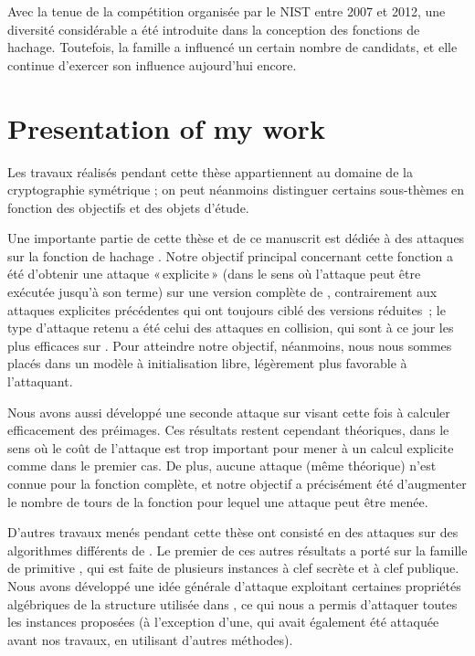 Avec la tenue de la compétition \shathree organisée par le NIST entre 2007 et 2012, une diversité considérable a été introduite dans la conception des fonctions de hachage.
Toutefois, la famille \mdsha a influencé un certain nombre de candidats, et elle continue d'exercer son influence aujourd'hui encore.

\chapter[Présentation de mes travaux]{Presentation of my work}

Les travaux réalisés pendant cette thèse appartiennent au domaine de la cryptographie symétrique ; on peut néanmoins distinguer certains sous-thèmes en fonction des objectifs et des objets d'étude.

\medskip

Une importante partie de cette thèse et de ce manuscrit est dédiée à des attaques sur la fonction de hachage \shaone. Notre objectif principal concernant cette fonction a été d'obtenir
une attaque «\,explicite\,» (dans le sens où l'attaque peut être exécutée jusqu'à son terme) sur une version complète de \shaone,
contrairement aux attaques explicites précédentes
qui ont toujours ciblé des versions réduites~; le type d'attaque retenu a été celui des attaques en collision, qui sont à ce jour les plus efficaces sur \shaone.
Pour atteindre notre objectif, néanmoins, nous nous sommes placés dans un modèle à initialisation libre, légèrement plus favorable à l'attaquant.

Nous avons aussi développé une seconde attaque sur \shaone visant cette fois à calculer efficacement des préimages. Ces résultats restent cependant théoriques, dans le sens où le coût
de l'attaque est trop important pour mener à un calcul explicite comme dans le premier cas. De plus, aucune attaque (même théorique) n'est connue pour la fonction complète, et notre
objectif a précisément été d'augmenter le nombre de tours de la fonction pour lequel une attaque peut être menée.

\medskip

D'autres travaux menés pendant cette thèse ont consisté en des attaques sur des algorithmes différents de \shaone. Le premier de ces autres résultats a porté sur la famille de primitive
\asasa, qui est faite de plusieurs instances à clef secrète et à clef publique. Nous avons développé une idée générale d'attaque exploitant certaines propriétés algébriques de la
structure utilisée dans \asasa, ce qui nous a permis d'attaquer toutes les instances proposées (à l'exception d'une, qui avait également été attaquée avant nos travaux, en utilisant
d'autres méthodes).

